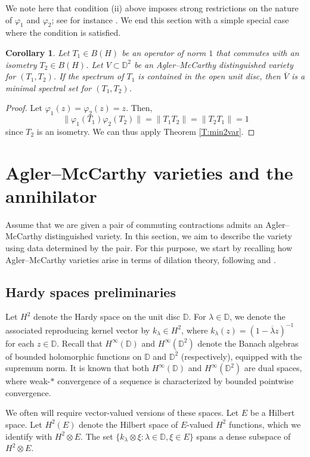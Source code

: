 \documentclass[10pt]{amsart}
\newcommand{\bD}{{\mathbb{D}}}
\renewcommand{\phi}{\varphi}
\newcommand{\ol}{\overline}
\newtheorem{corollary}[lemma]{Corollary}
\theoremstyle{definition}
\begin{document}
We note here that condition (ii) above imposes strong restrictions on the nature of $\phi_1$ and $\phi_2$; see for instance \cite[Theorem 2]{williams1967}. We end this section with a simple special case where the condition is satisfied.


\begin{corollary}\label{C:min2varisom}
Let $T_1\in B(H)$ be an operator of norm $1$ that commutes with an isometry $T_2\in B(H)$. Let $V\subset \bD^2$ be an Agler--McCarthy distinguished variety for $(T_1,T_2)$. If the spectrum of $T_1$ is contained in the open unit disc, then $\ol{V}$ is a minimal spectral set for $(T_1,T_2)$.
\end{corollary}
\begin{proof}
Let $\phi_1(z)=\phi_2(z)=z$. Then, 
\[
\|\phi_1(T_1)\phi_2(T_2)\|=\|T_1 T_2\|=\|T_2 T_1\|=1
\]
since $T_2$ is an isometry. We can thus apply Theorem \ref{T:min2var}.
\end{proof}




\section{Agler--McCarthy varieties and the annihilator}\label{S:specsynth}

Assume that we are given a pair of commuting contractions admits an Agler--McCarthy distinguished variety.  In this section, we aim to describe the variety using data determined by the pair. For this purpose, we start by recalling how Agler--McCarthy varieties arise in terms of dilation theory, following \cite{AM2005} and \cite{DS2017}.

\subsection{Hardy spaces preliminaries}
Let $H^2$ denote the Hardy space on the unit disc $\bD$. For $\lambda\in \bD$, we denote the associated reproducing kernel vector by $k_\lambda\in H^2$, where $k_\lambda(z)=(1-\ol{\lambda}z)^{-1}$ for each $z\in \bD$.
Recall that $H^\infty(\bD)$ and $H^\infty(\bD^2)$ denote the Banach algebras of bounded holomorphic functions on $\bD$ and $\bD^2$ (respectively), equipped with the supremum norm. It is known that both $H^\infty(\bD)$ and $H^\infty(\bD^2)$ are dual spaces, where weak-$*$ convergence of a sequence is characterized by bounded pointwise convergence.

We often will require vector-valued versions of these spaces. Let $E$ be a Hilbert space. Let $H^2(E)$ denote the Hilbert space of $E$-valued $H^2$ functions, which we identify with $H^2\otimes E$. The set $\{k_\lambda\otimes \xi:\lambda\in \bD, \xi\in E\}$ spans a dense subspace of $H^2\otimes E$. 
\end{document}
